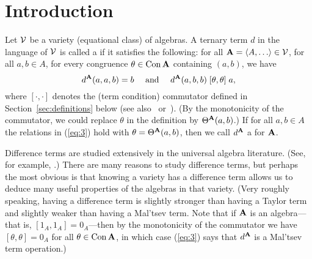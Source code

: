 \newtheorem{thm}{Theorem}[section]
\newtheorem{lem}[thm]{Lemma}
\newtheorem{cor}[thm]{Corollary}

\newtheorem{rem}[thm]{Remark}
\newtheorem{prob}{Problem}







\section{Introduction}
\label{sec:introduction}
Let $\mathcal{V}$ be a variety (equational class) of algebras.
A ternary term $d$ in the language of $\mathcal{V}$ is called 
a  if it satisfies the following:
for all $\bA = \<A, \dots \> \in \sV$, for all $a, b \in A$, for every 
congruence $\theta\in \operatorname{Con}\mathbf{A}$ containing $(a,b)$, we have
\begin{equation}
\label{eq:3}  
d^{\bA}(a,a,b) = b \quad \text{ and } \quad
d^{\bA}(a,b,b) \comm \theta \theta a,
\end{equation}
where $[\cdot, \cdot]$ denotes the (term condition) commutator
defined in Section~\ref{sec:definitions} below
(see also~\cite{HM:1988} or~\cite{MR3076179}).
(By the monotonicity of the commutator, we could replace $\theta$ in the
definition by $\Theta^{\mathbf{A}}(a,b)$.)
If for all $a, b \in A$ the relations in (\ref{eq:3}) hold 
with $\theta = \Theta^{\mathbf{A}}(a,b)$, then we call
$d^{\mathbf{A}}$ a  for $\mathbf{A}$.

Difference terms are studied extensively in the universal algebra literature.
(See, for example, \cite{HM:1988,KSW,MR3449235,MR1358491,MR3076179,MR1663558}.)
There are many reasons to study difference terms, but
perhaps the most obvious is that knowing a variety 
has a difference term allows us to deduce many useful
properties of the algebras in that variety.
(Very roughly speaking, having a difference term is slightly stronger than having
a Taylor term and slightly weaker than having a Mal'tsev term.
Note that if
$\mathbf{A}$ is an  algebra---that is, $[1_A, 1_A] = 0_A$---then by
the monotonicity of the commutator we have
$[\theta, \theta] = 0_A$ for all $\theta \in \operatorname{Con} \mathbf{A}$, in which case
(\ref{eq:3}) says that $d^{\mathbf{A}}$ is a Mal'tsev term operation.)


